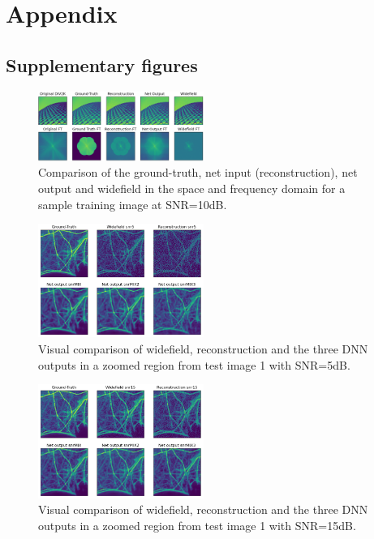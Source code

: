 \documentclass[conference]{IEEEtran}
\begin{document}
\newpage



\newpage
\section{Appendix}
\subsection{Supplementary figures}
\begin{figure}[h!]
    \centering
    \includegraphics[width=0.48\textwidth]{images/images_and_FTs_extended.png}
    \caption{Comparison of the ground-truth, net input (reconstruction), net output and widefield in the space and frequency domain for a sample training image at SNR=10dB.}
    \label{fig:images_and_FTs_output}
\end{figure}
\begin{figure}[h!]
    \centering
    \includegraphics[width=0.48\textwidth]{images/test_img_4_model_comp_snr5.png}
    \caption{Visual comparison of widefield, reconstruction and the three DNN outputs in a zoomed region from test image 1 with SNR=5dB.}
    \label{fig:test_img_4_model_comp_snr5}
\end{figure}
\begin{figure}[h!]
    \centering
    \includegraphics[width=0.48\textwidth]{images/test_img_4_model_comp_snr15.png}
    \caption{Visual comparison of widefield, reconstruction and the three DNN outputs in a zoomed region from test image 1 with SNR=15dB.}
    \label{fig:test_img_4_model_comp_snr15}
\end{figure}
\end{document}
